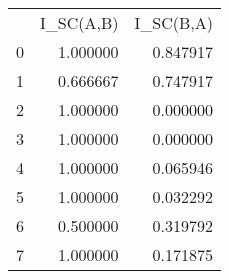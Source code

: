 \begin{tabular}{lrr}
 & I_SC(A,B) & I_SC(B,A) \\
0 & 1.000000 & 0.847917 \\
1 & 0.666667 & 0.747917 \\
2 & 1.000000 & 0.000000 \\
3 & 1.000000 & 0.000000 \\
4 & 1.000000 & 0.065946 \\
5 & 1.000000 & 0.032292 \\
6 & 0.500000 & 0.319792 \\
7 & 1.000000 & 0.171875 \\
\end{tabular}
